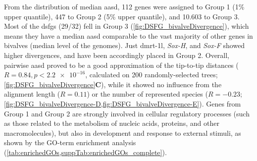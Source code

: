 From the distribution of median \gls{aasd}, 112 genes were assigned to Group 1 (1\% upper quantile), 447 to Group 2 (5\% upper quantile), and 10.603 to Group 3. Most of the \glspl{dsfg} (29/32) fell in Group 3 (\cref{fig:DSFG_bivalveDivergence}), which means they have a median \gls{aasd} comparable to the vast majority of other genes in bivalves (median level of the genomes). Just \gls{dmrt-1l}, \textit{Sox-H}, and \textit{Sox-F} showed higher divergences, and have been accordingly placed in Group 2. Overall, pairwise \gls{aasd} proved to be a good approximation of the tip-to-tip distances ($R = 0.84, p < \num{2.2e-16}$, calculated on 200 randomly-selected trees; \cref{fig:DSFG_bivalveDivergence}\textbf{C}), while it showed no influence from the alignment length ($R = 0.11$) or the number of represented species ($R = -0.23$; \cref{fig:DSFG_bivalveDivergence-D,fig:DSFG_bivalveDivergence-E}). Genes from Group 1 and Group 2 are strongly involved in cellular regulatory processes (such as those related to the metabolism of nucleic acids, proteins, and other macromolecules), but also in development and response to external stimuli, as shown by the GO-term enrichment analysis (\cref{tab:enrichedGOs,suppTab:enrichedGOs_complete}).


